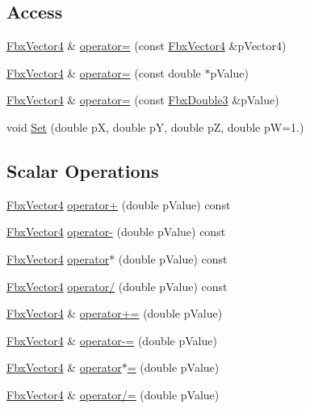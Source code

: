 \subsection*{Access}
\begin{DoxyCompactItemize}
\item 
\hyperlink{class_fbx_vector4}{Fbx\+Vector4} \& \hyperlink{class_fbx_vector4_a0080c936a55f46673fe7cbbb0d405f7b}{operator=} (const \hyperlink{class_fbx_vector4}{Fbx\+Vector4} \&p\+Vector4)
\item 
\hyperlink{class_fbx_vector4}{Fbx\+Vector4} \& \hyperlink{class_fbx_vector4_aa769657f335b31564497a8950fc50213}{operator=} (const double $\ast$p\+Value)
\item 
\hyperlink{class_fbx_vector4}{Fbx\+Vector4} \& \hyperlink{class_fbx_vector4_afd3267e501ae3b8932d2a1c6a3ee378a}{operator=} (const \hyperlink{fbxtypes_8h_ae0a96f14cde566774c7553aa7523b7a7}{Fbx\+Double3} \&p\+Value)
\item 
void \hyperlink{class_fbx_vector4_a795ea8407ea23691a90e0fbb349170c5}{Set} (double pX, double pY, double pZ, double pW=1.)
\end{DoxyCompactItemize}
\subsection*{Scalar Operations}
\begin{DoxyCompactItemize}
\item 
\hyperlink{class_fbx_vector4}{Fbx\+Vector4} \hyperlink{class_fbx_vector4_a4a3e913f9e722a63bc23cc0fe324965e}{operator+} (double p\+Value) const
\item 
\hyperlink{class_fbx_vector4}{Fbx\+Vector4} \hyperlink{class_fbx_vector4_a121047a8e75df11dbd8ec10c0cff8cbb}{operator-\/} (double p\+Value) const
\item 
\hyperlink{class_fbx_vector4}{Fbx\+Vector4} \hyperlink{class_fbx_vector4_aaa3324f6bdec531593e46004db16bdf8}{operator$\ast$} (double p\+Value) const
\item 
\hyperlink{class_fbx_vector4}{Fbx\+Vector4} \hyperlink{class_fbx_vector4_a202692980b2d21bc5089e3d31f40b543}{operator/} (double p\+Value) const
\item 
\hyperlink{class_fbx_vector4}{Fbx\+Vector4} \& \hyperlink{class_fbx_vector4_a7585be2323b66c795e0eab14498ee78b}{operator+=} (double p\+Value)
\item 
\hyperlink{class_fbx_vector4}{Fbx\+Vector4} \& \hyperlink{class_fbx_vector4_a536bc542d0cb4cf6d4c86b1cf34d62a5}{operator-\/=} (double p\+Value)
\item 
\hyperlink{class_fbx_vector4}{Fbx\+Vector4} \& \hyperlink{class_fbx_vector4_ab5d9688dc2682376c623db6d4b0edcd9}{operator$\ast$=} (double p\+Value)
\item 
\hyperlink{class_fbx_vector4}{Fbx\+Vector4} \& \hyperlink{class_fbx_vector4_a70953f7aa47d51868a3a9020a982b749}{operator/=} (double p\+Value)
\end{DoxyCompactItemize}
